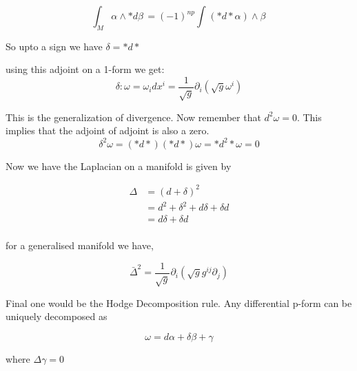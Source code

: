\documentclass{article}
\begin{document}
\[ \int_{M}^{} \alpha \wedge * d \beta\,  = (-1)^{np} \int_{}^{} (*d*\alpha) \wedge \beta\,  \]

So upto a sign we have \( \delta = *d* \)

using this adjoint on a 1-form we get: 
\[ \delta: \omega = \omega_i dx^i = \frac{1}{\sqrt{g}} \partial_i (\sqrt{g}\omega^i) \]

This is the generalization of divergence.
Now remember that \( d^2 \omega = 0 \). This implies that the adjoint of adjoint is also a zero. 
\[ \delta^2 \omega = (*d*)(*d*) \omega = *d^2 * \omega = 0 \]

Now we have the Laplacian on a manifold is given by 

\begin{align*}
\Delta &= (d+\delta)^2 \\
&= d^2 + \delta^2 + d \delta + \delta d  \\
&= d \delta + \delta d  \\
\end{align*}

for a generalised manifold we have, 

\[ \bar \Delta^2 = \frac{1}{\sqrt{g}} \partial_i (\sqrt{g} g^{ij} \partial_j) \]

Final one would be the Hodge Decomposition rule. Any differential p-form can be uniquely decomposed as 

\[ \omega = d \alpha + \delta \beta + \gamma \] 

where \( \Delta \gamma = 0 \)
\end{document}
